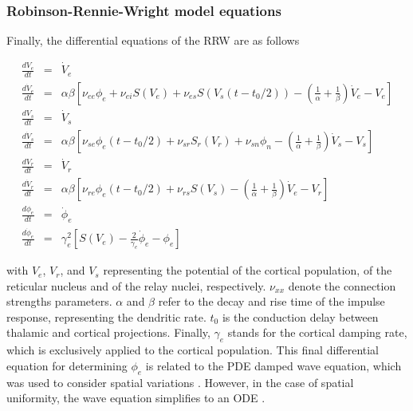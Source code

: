 \documentclass[12pt,twoside]{article}
\begin{document}
\subsubsection*{Robinson-Rennie-Wright model equations}

Finally, the differential equations of the RRW are as follows

\begin{eqnarray}
    \frac{dV_{e}}{dt} &=& \dot{V}_{e}\\
    \frac{d\dot{V}_{e}}{dt} &=& \alpha \beta[\nu_{ee}\phi_{e} + \nu_{ei}S(V_{e}) + \nu_{es}S(V_{s}(t-t_{0}/2)) - (\frac{1}{\alpha}+\frac{1}{\beta})\dot{V}_{e} - V_{e}]\\
    \frac{dV_{s}}{dt} &=& \dot{V}_{s}\\
    \frac{d\dot{V}_{s}}{dt} &=& \alpha \beta[\nu_{se}\phi_{e}(t-t_{0}/2) + \nu_{sr}S_{r}(V_{r}) + \nu_{sn}\phi_{n} - (\frac{1}{\alpha}+\frac{1}{\beta})\dot{V}_{s} - V_{s}]\\
    \frac{dV_{r}}{dt} &=& \dot{V}_{r}\\
    \frac{d\dot{V}_{r}}{dt} &=& \alpha \beta[\nu_{re}\phi_{e}(t-t_{0}/2) + \nu_{rs}S(V_{s}) - (\frac{1}{\alpha}+\frac{1}{\beta})\dot{V}_{e} - V_{r}]\\
    \frac{d\phi_{e}}{dt} &=& \dot{\phi}_{e}\\
    \frac{d\dot{\phi}_{e}}{dt} &=& \gamma_{e}^{2}[S(V_{e}) - \frac{2}{\gamma_{e}}\dot{\phi}_{e}-\phi_{e}]
\end{eqnarray}

with $V_e$, $V_r$, and $V_s$ representing the potential of the cortical population, of the reticular nucleus and of the relay nuclei, respectively. $\nu_{xx}$ denote the connection strengths parameters. $\alpha$ and $\beta$ refer to the decay and rise time of the impulse response, representing the  dendritic rate. $t_0$ is the conduction delay between thalamic and cortical projections. Finally, $\gamma_e$ stands for the cortical damping rate, which is exclusively applied to the cortical population. This final differential equation for determining $\phi_e$ is related to the PDE damped wave equation, which was used to consider spatial variations \citep{robinson1997propagation}. However, in the case of spatial uniformity, the wave equation simplifies to an ODE \citep{zhao2015generalized}.
\end{document}
